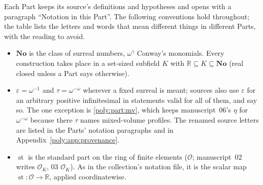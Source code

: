 \documentclass[11pt,a4paper]{article}
\numberwithin{equation}{section}
\theoremstyle{plain}
\newcommand{\No}{\mathbf{No}}
\newcommand{\R}{\mathbb R}
\newcommand{\eps}{\varepsilon}
\newcommand{\st}{\operatorname{st}}
\newcommand{\cO}{\mathcal{O}}
\newcommand{\OO}{\mathcal O}
\begin{document}
Each Part keeps its source's definitions and hypotheses and opens with a
paragraph ``Notation in this Part''. The following conventions hold
throughout; the table lists the letters and words that mean different things
in different Parts, with the reading to avoid.

\begin{itemize}
\item $\No$ is the class of surreal numbers, $\omega^\gamma$ Conway's
monomials. Every construction takes place in a set-sized subfield $K$ with
$\R\subseteq K\subseteq\No$ (real closed unless a Part says otherwise).
\item $\eps=\omega^{-1}$ and $\tau=\omega^{-\omega}$ wherever a fixed surreal
is meant; sources also use $\eps$ for an arbitrary positive infinitesimal in
statements valid for all of them, and say so. The one exception is
\cref{poly:part:mv}, which keeps manuscript~06's $\eta$ for
$\omega^{-\omega}$ because there $\tau$ names mixed-volume profiles. The
renamed source letters
are listed in the Parts' notation paragraphs and in
Appendix~\ref{poly:app:provenance}.
\item $\st$ is the standard part on the ring of finite elements
($\OO$; manuscript~02 writes $\cO_K$, 03 $\mathcal O_K$). As in the
collection's notation file, it is the scalar map $\st:\OO\to\R$, applied
coordinatewise.
\end{itemize}
\end{document}
